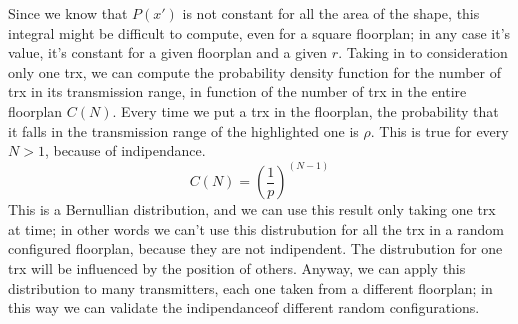 Since we know that $P(x')$ is not constant for all the area of the shape, this integral might be difficult to compute,
even for a square floorplan; in any case it's value, it's constant for a given floorplan and a given $r$.
Taking in to consideration only one trx, we can compute the probability density function for the number of trx in its
transmission range, in function of the number of trx in the entire floorplan $C(N)$. Every time we put
a trx in the floorplan, the probability that it falls in the transmission range of the highlighted one is $\rho$. This is true
for every $N > 1$, because of indipendance. 
\begin{equation*}
	C(N)= \left(\frac{1}{p}\right)^{\left( N-1 \right)}
  \end{equation*}
This is a Bernullian distribution, and we can use this result only taking one trx at time; in other words we can't use this 
distrubution for all the trx in a random configured floorplan, because they are not indipendent. 
The distrubution for one trx will be influenced by the position of others. 
Anyway, we can apply this distribution to many transmitters, each one taken from a different floorplan; in this way we can 
validate the indipendanceof different random configurations.\\